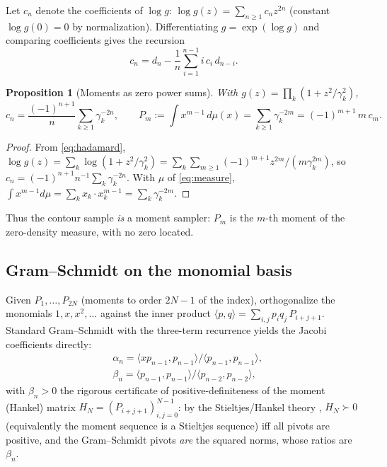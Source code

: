 \documentclass[11pt]{article}
\newtheorem{proposition}{Proposition}
\theoremstyle{definition}
\begin{document}
Let $c_n$ denote the coefficients of $\log g$:
$\log g(z)=\sum_{n\ge1}c_n z^{2n}$ (constant $\log g(0)=0$ by
normalization). Differentiating $g=\exp(\log g)$ and comparing
coefficients gives the recursion
\begin{equation}\label{eq:logrec}
c_n=d_n-\frac{1}{n}\sum_{i=1}^{n-1} i\,c_i\,d_{n-i}.
\end{equation}

\begin{proposition}[Moments as zero power sums]\label{prop:moments}
With $g(z)=\prod_k(1+z^2/\gamma_k^2)$,
\[
c_n=\frac{(-1)^{n+1}}{n}\sum_{k\ge1}\gamma_k^{-2n},
\qquad
P_m:=\int x^{m-1}\,d\mu(x)=\sum_{k\ge1}\gamma_k^{-2m}
=(-1)^{m+1}\,m\,c_m .
\]
\end{proposition}

\begin{proof}
From \eqref{eq:hadamard},
$\log g(z)=\sum_k\log(1+z^2/\gamma_k^2)
=\sum_k\sum_{m\ge1}(-1)^{m+1}z^{2m}/(m\gamma_k^{2m})$,
so $c_n=(-1)^{n+1}n^{-1}\sum_k\gamma_k^{-2n}$.
With $\mu$ of \eqref{eq:measure},
$\int x^{m-1}d\mu=\sum_k x_k\cdot x_k^{m-1}=\sum_k\gamma_k^{-2m}$.
\end{proof}

Thus the contour sample \emph{is} a moment sampler: $P_m$ is the
$m$-th moment of the zero-density measure, with no zero located.

\subsection{Gram--Schmidt on the monomial basis}

Given $P_1,\dots,P_{2N}$ (moments to order $2N-1$ of the index),
orthogonalize the monomials $1,x,x^2,\dots$ against the inner product
$\langle p,q\rangle=\sum_{i,j}p_i q_j\,P_{i+j+1}$. Standard
Gram--Schmidt with the three-term recurrence yields the Jacobi
coefficients directly:
\begin{equation}\label{eq:gs}
\begin{aligned}
&\alpha_n=\langle x p_{n-1},p_{n-1}\rangle/\langle p_{n-1},p_{n-1}\rangle,\\
&\beta_n=\langle p_{n-1},p_{n-1}\rangle/\langle p_{n-2},p_{n-2}\rangle,
\end{aligned}
\end{equation}
with $\beta_n>0$ the rigorous certificate of positive-definiteness of
the moment (Hankel) matrix $H_N=(P_{i+j+1})_{i,j=0}^{N-1}$:
by the Stieltjes/Hankel theory \cite{ShohatTamarkin,Gautschi2004},
$H_N\succ0$ (equivalently the moment sequence is a Stieltjes
sequence) iff all pivots are positive, and the Gram--Schmidt pivots
\emph{are} the squared norms, whose ratios are $\beta_n$.
\end{document}
